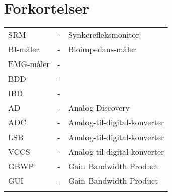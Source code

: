 \chapter{Forkortelser}

\begin{table}[H]
\center
{}
\begin{tabularx}{\linewidth}{l l X}	
SRM         & - &   Synkerefleksmonitor \\ \addlinespace[2mm]
BI-måler         & - &   Bioimpedans-måler \\ \addlinespace[2mm]
EMG-måler   & - &    \\ \addlinespace[2mm]
BDD   & - &    \\ \addlinespace[2mm]
IBD  & - &    \\ \addlinespace[2mm]
AD  & - &  Analog Discovery  \\ \addlinespace[2mm]
ADC  & - &  Analog-til-digital-konverter  \\ \addlinespace[2mm]
LSB  & - &  Analog-til-digital-konverter  \\ \addlinespace[2mm]
VCCS & - &  Analog-til-digital-konverter  \\ \addlinespace[2mm]
GBWP & - &  Gain Bandwidth Product  \\ \addlinespace[2mm]
GUI & - &  Gain Bandwidth Product  \\ \addlinespace[2mm]
\end{tabularx}
\end{table}